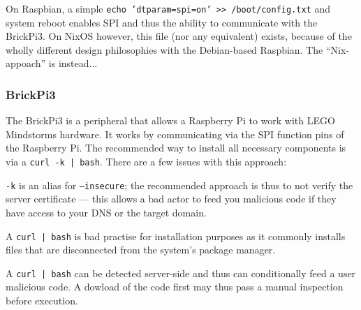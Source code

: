 On Raspbian, a simple \texttt{echo 'dtparam=spi=on' >> /boot/config.txt} and system reboot enables SPI and thus the ability to communicate with the BrickPi3.
On NixOS however, this file (nor any equivalent) exists, because of the wholly different design philosophies with the Debian-based Raspbian.
The ``Nix-appoach'' is instead...


\subsubsection{BrickPi3}
The BrickPi3 is a peripheral that allows a Raspberry Pi to work with LEGO Mindstorms hardware.
It works by communicating via the SPI function pins of the Raspberry Pi.
The recommended way to install all necessary components is via a \texttt{curl -k | bash}.
There are a few issues with this approach:
\begin{inline-enum}
\item \texttt{-k} is an alias for \texttt{--insecure};
  the recommended approach is thus to not verify the server certificate ---
  this allows a bad actor to feed you malicious code if they have access to your DNS or the target domain.
\item A \texttt{curl | bash} is bad practise for installation purposes as it commonly installs files that are disconnected from the system's package manager.
\item A \texttt{curl | bash} can be detected server-side and thus can conditionally feed a user malicious code.
  A dowload of the code first may thus pass a manual inspection before execution. \parencite{curl-bash}
\end{inline-enum}

